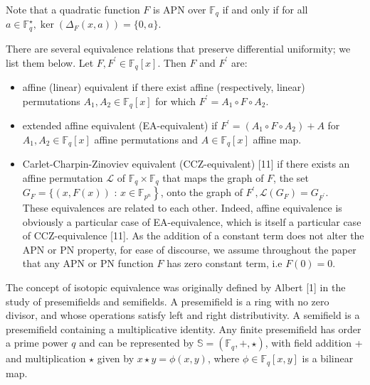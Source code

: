 \documentclass[10pt]{article}
\begin{document}
Note that a quadratic function $F$ is APN over $\mathbb{F}_{q}$ if and only if for all $a \in \mathbb{F}_{q}^{\star}, \operatorname{ker}\left(\Delta_{F}(x, a)\right)=\{0, a\}$.

There are several equivalence relations that preserve differential uniformity; we list them below. Let $F, F^{\prime} \in \mathbb{F}_{q}[x]$. Then $F$ and $F^{\prime}$ are:

\begin{itemize}
  \item affine (linear) equivalent if there exist affine (respectively, linear) permutations $A_{1}, A_{2} \in \mathbb{F}_{q}[x]$ for which $F^{\prime}=A_{1} \circ F \circ A_{2}$.
  \item extended affine equivalent (EA-equivalent) if $F^{\prime}=\left(A_{1} \circ\right. \left.F \circ A_{2}\right)+A$ for $A_{1}, A_{2} \in \mathbb{F}_{q}[x]$ affine permutations and $A \in \mathbb{F}_{q}[x]$ affine map.
  \item Carlet-Charpin-Zinoviev equivalent (CCZ-equivalent) [11] if there exists an affine permutation $\mathcal{L}$ of $\mathbb{F}_{q} \times \mathbb{F}_{q}$ that maps the graph of $F$, the set $G_{F}=\{(x, F(x))$ : $\left.x \in \mathbb{F}_{p^{n}}\right\}$, onto the graph of $F^{\prime}, \mathcal{L}\left(G_{F}\right)=G_{F^{\prime}}$.\\[0pt]
These equivalences are related to each other. Indeed, affine equivalence is obviously a particular case of EA-equivalence, which is itself a particular case of CCZ-equivalence [11]. As the addition of a constant term does not alter the APN or PN property, for ease of discourse, we assume throughout the paper that any APN or PN function $F$ has zero constant term, i.e $F(0)=0$.
\end{itemize}

The concept of isotopic equivalence was originally defined by Albert [1] in the study of presemifields and semifields. A presemifield is a ring with no zero divisor, and whose operations satisfy left and right distributivity. A semifield is a presemifield containing a multiplicative identity. Any finite presemifield has order a prime power $q$ and can be represented by $\mathbb{S}=\left(\mathbb{F}_{q},+, \star\right)$, with field addition + and multiplication $\star$ given by $x \star y=\phi(x, y)$, where $\phi \in \mathbb{F}_{q}[x, y]$ is a bilinear map.
\end{document}
